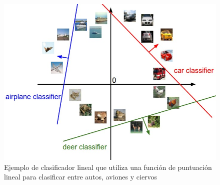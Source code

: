 \documentclass[a4paper,11pt,spanish]{book}
\begin{document}
	  \begin{figure}[h!]
	    \begin{center}
	     \includegraphics[scale=0.5]{./img/stanford_linear_class.jpeg}
	    \end{center}
	    \caption{Ejemplo de clasificador lineal que utiliza una función de puntuación lineal para clasificar entre autos, aviones y ciervos}
	    \label{fig:figure2}
	  \end{figure}
\end{document}
